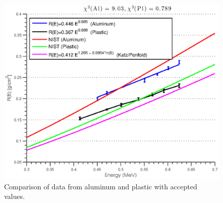\begin{figure}[htbp]
  \centering 
  \includegraphics[width=\MyWidth]{Figures/alum_plas_NIST_plot.eps}
  \caption{Comparison of data from aluminum and plastic with accepted values.}
  \label{fig:Figures_alum_plas_NIST_plot}
\end{figure}%

